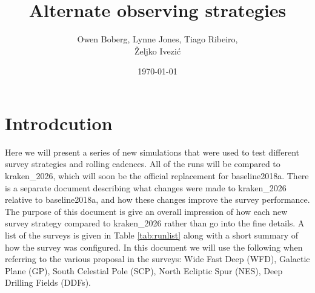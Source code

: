 \documentclass[DM,lsstdraft,authoryear,toc]{lsstdoc}
\title{Alternate observing strategies}
\author{%
Owen Boberg,
Lynne Jones,
Tiago Ribeiro, \\
\v{Z}eljko Ivezi\'{c}}
\date{\today}
\begin{document}
\maketitle

\section{Introdcution}

Here we will present a series of new simulations that were used to test different survey strategies and rolling cadences.
All of the runs will be compared to kraken\_2026, which will soon be the official replacement for baseline2018a. There is
a separate document describing what changes were made to kraken\_2026 relative to baseline2018a, and how these changes
improve the survey performance. The purpose of this document is give an overall impression of how each new survey strategy 
compared to kraken\_2026 rather than go into the fine details. A list of the surveys is given in Table \ref{tab:runlist} along with
a short summary of how the survey was configured. In this document we will use the following when referring to the various
proposal in the surveys: Wide Fast Deep (WFD), Galactic Plane (GP), South Celestial Pole (SCP), North Ecliptic Spur (NES),
Deep Drilling Fields (DDFs).
\end{document}
